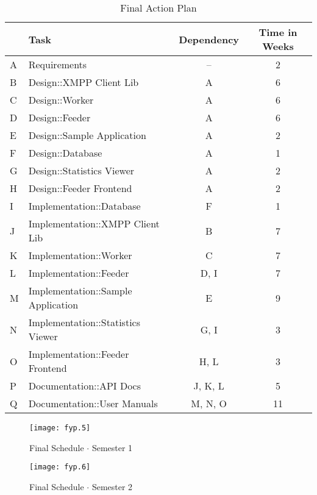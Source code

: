 \begin{table}[H]
\begin{tabularx}{\linewidth}{llcc}
\toprule
\textbf{} & \textbf{Task} & \textbf{Dependency} & \textbf{Time in Weeks} \\
\midrule
\endhead
A & Requirements                       & --      & 2  \\
B & Design::XMPP Client Lib            & A       & 6  \\
C & Design::Worker                     & A       & 6  \\
D & Design::Feeder                     & A       & 6  \\
E & Design::Sample Application         & A       & 2  \\
F & Design::Database                   & A       & 1  \\
G & Design::Statistics Viewer          & A       & 2  \\
H & Design::Feeder Frontend            & A       & 2  \\
I & Implementation::Database           & F       & 1  \\
J & Implementation::XMPP Client Lib    & B       & 7  \\
K & Implementation::Worker             & C       & 7  \\
L & Implementation::Feeder             & D, I    & 7  \\
M & Implementation::Sample Application & E       & 9  \\
N & Implementation::Statistics Viewer  & G, I    & 3  \\
O & Implementation::Feeder Frontend    & H, L    & 3  \\
P & Documentation::API Docs            & J, K, L & 5  \\
Q & Documentation::User Manuals        & M, N, O & 11 \\
\bottomrule
\end{tabularx}
\caption{Final Action Plan}
\label{tab:fin_actionplan}
\end{table}

\begin{figure}[H]
\begin{flushleft}
\texttt{[image: fyp.5]}
\end{flushleft}
\caption{Final Schedule $\cdot$ Semester 1}
\label{fig:fin_gantt1}
\end{figure}

\begin{figure}[H]
\begin{flushleft}
\texttt{[image: fyp.6]}
\end{flushleft}
\caption{Final Schedule $\cdot$ Semester 2}
\label{fig:fin_gantt2}
\end{figure}


